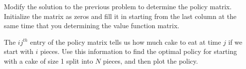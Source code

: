 \begin{problem}
Modify the solution to the previous problem to determine the policy matrix.
Initialize the matrix as zeros and fill it in starting from the last column at the same time that you determining the value function matrix.
\end{problem}

\begin{problem}
The $ij^{th}$ entry of the policy matrix tells us how much cake to eat at time $j$ if we start with $i$ pieces.
Use this information to find the optimal policy for starting with a cake of size 1 split into $N$ pieces, and then plot the policy.
\end{problem}

